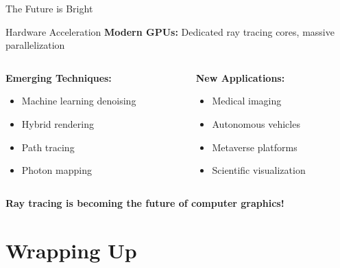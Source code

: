 \begin{frame}{The Future is Bright}
    \begin{conceptbox}{Hardware Acceleration}
        \textbf{Modern GPUs:} Dedicated ray tracing cores, massive parallelization
    \end{conceptbox}

    \vspace{0.3cm}

    \begin{columns}
        \begin{column}{0.5\textwidth}
            \textbf{Emerging Techniques:}
            \begin{itemize}
                \item Machine learning denoising
                \item Hybrid rendering
                \item Path tracing
                \item Photon mapping
            \end{itemize}
        \end{column}
        \begin{column}{0.5\textwidth}
            \textbf{New Applications:}
            \begin{itemize}
                \item Medical imaging
                \item Autonomous vehicles
                \item Metaverse platforms
                \item Scientific visualization
            \end{itemize}
        \end{column}
    \end{columns}

    \vspace{0.5cm}

    \begin{center}
        \large \textcolor{PrimaryColor}{\textbf{Ray tracing is becoming the future of computer graphics!}}
    \end{center}
\end{frame}

\section{Wrapping Up}

